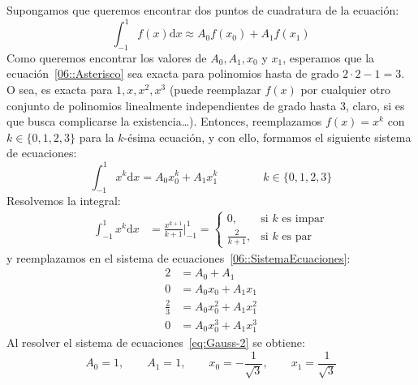   \begin{ejemplo}
    \label{06::CuadGauss:n2}
    Supongamos que queremos encontrar dos puntos de cuadratura de la ecuación:
    \begin{equation}
      \label{06::Asterisco}
      \int_{-1}^1 f(x) \mathrm{d} x
        \approx A_0 f(x_0) + A_1 f(x_1)
      \end{equation}
      Como queremos encontrar los valores de \(A_0, A_1, x_0\) y \(x_1\),
      esperamos que la ecuación~\eqref{06::Asterisco}
      sea exacta para polinomios hasta de grado \(2 \cdot 2 - 1 = 3\).
      O sea,
      es exacta para \(1, x, x^2, x^3\)
      (puede reemplazar \(f(x)\)
       por cualquier otro conjunto de polinomios linealmente independientes
       de grado hasta \num{3},
       claro,
       si es que busca complicarse la existencia\ldots).
      Entonces,
      reemplazamos \(f(x) = x^k\) con \(k \in \{ 0, 1, 2, 3 \}\)
      para la \(k\)-ésima ecuación,
      y con ello,
      formamos el siguiente sistema de ecuaciones:
      \begin{equation}
        \label{06::SistemaEcuaciones}
        \int_{-1}^{1} x^k \mathrm{d} x
          = A_0 x_0^k + A_1 x_1^k
              \qquad\qquad k \in \{ 0, 1, 2, 3 \}
      \end{equation}
      Resolvemos la integral:
      \begin{align*}
        \int_{-1}^1 x^k \mathrm{d} x
          &= \frac{x^{k + 1}}{k + 1} \Bigg |_{-1}^1
           = \begin{cases}
               0,		&\text{si \(k\) es impar} \\
               \frac{2}{k + 1}, &\text{si \(k\) es par}
             \end{cases}
      \end{align*}
      y reemplazamos en el sistema de ecuaciones~\eqref{06::SistemaEcuaciones}:
      \begin{equation}
        \label{eq:Gauss-2}
        \begin{split}
          2
            &= A_0 + A_1 \\
          0
            &= A_0 x_0 + A_1 x_1 \\
          \frac{2}{3}
            &= A_0 x_0^2 + A_1 x_1^2 \\
          0
            &= A_0 x_0^3 + A_1 x_1^3
        \end{split}
      \end{equation}
      Al resolver el sistema de ecuaciones~\eqref{eq:Gauss-2} se obtiene:
      \begin{equation*}
        A_0 = 1,\qquad A_1 = 1,\qquad
        x_0 = - \frac{1}{\sqrt{3}},\qquad x_1 = \frac{1}{\sqrt{3}}
      \end{equation*}
    \end{ejemplo}
